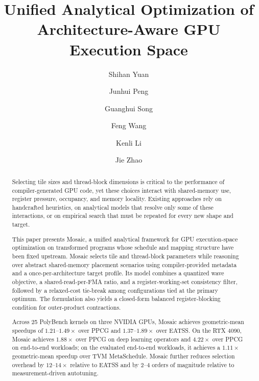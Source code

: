 \documentclass[acmsmall,anonymous,screen]{acmart}
\newcommand{\name}{{Mosaic}\xspace}
\begin{document}
\title[Analytical Optimization of Architecture-Aware GPU Code Generation]
{Unified Analytical Optimization of Architecture-Aware GPU Execution Space}

\author{Shihan Yuan}
\author{Junhui Peng}
\author{Guanghui Song}
\author{Feng Wang}
\author{Kenli Li}
\author{Jie Zhao}


\begin{abstract}
Selecting tile sizes and thread-block dimensions is critical to the performance of compiler-generated GPU code, yet these choices interact with shared-memory use, register pressure, occupancy, and memory locality. Existing approaches rely on handcrafted heuristics, on analytical models that resolve only some of these interactions, or on empirical search that must be repeated for every new shape and target.

This paper presents \name, a unified analytical framework for GPU execution-space optimization on transformed programs whose schedule and mapping structure have been fixed upstream. \name selects tile and thread-block parameters while reasoning over abstract shared-memory placement scenarios using compiler-provided metadata and a once-per-architecture target profile. Its model combines a quantized wave objective, a shared-read-per-FMA ratio, and a register-working-set consistency filter, followed by a relaxed-cost tie-break among configurations tied at the primary optimum. The formulation also yields a closed-form balanced register-blocking condition for outer-product contractions.

Across 25 PolyBench kernels on three NVIDIA GPUs, \name achieves geometric-mean speedups of $1.21$--$1.49\times$ over PPCG and $1.37$--$1.89\times$ over EATSS. On the RTX 4090, \name achieves $1.88\times$ over PPCG on deep learning operators and $4.22\times$ over PPCG on end-to-end workloads; on the evaluated end-to-end workloads, it achieves a $1.11\times$ geometric-mean speedup over TVM MetaSchedule. \name further reduces selection overhead by $12$--$14\times$ relative to EATSS and by $2$--$4$ orders of magnitude relative to measurement-driven autotuning.
\end{abstract}
\end{document}
